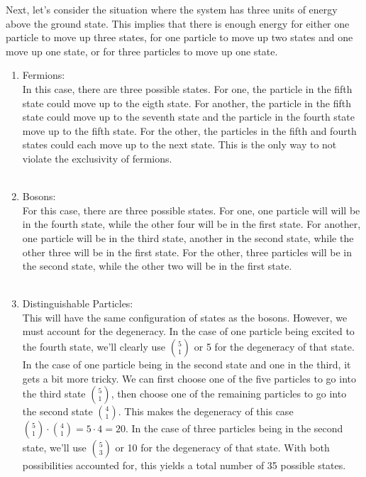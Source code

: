 \documentclass[12pt]{article}
\begin{document}
\begin{flushleft}
\begin{enumerate}
\end{enumerate}

Next, let's consider the situation where the system has three units of energy above the ground state.
This implies that there is enough energy for either one particle to move up three states, for one particle to move up two states and one move up one state, or for three particles to move up one state.
\begin{enumerate}

    \item Fermions:\\
    In this case, there are three possible states.
    For one, the particle in the fifth state could move up to the eigth state.
    For another, the particle in the fifth state could move up to the seventh state and the particle in the fourth state move up to the fifth state.
    For the other, the particles in the fifth and fourth states could each move up to the next state.
    This is the only way to not violate the exclusivity of fermions.\\~\\

    \item Bosons:\\
    For this case, there are three possible states.
    For one, one particle will will be in the fourth state, while the other four will be in the first state.
    For another, one particle will be in the third state, another in the second state, while the other three will be in the first state.
    For the other, three particles will be in the second state, while the other two will be in the first state.\\~\\

    \item Distinguishable Particles:\\
    This will have the same configuration of states as the bosons.
    However, we must account for the degeneracy.
    In the case of one particle being excited to the fourth state, we'll clearly use $5\choose1$ or 5 for the degeneracy of that state.
    In the case of one particle being in the second state and one in the third, it gets a bit more tricky.
    We can first choose one of the five particles to go into the third state $5\choose1$, then choose one of the remaining particles to go into the second state $4\choose1$.
    This makes the degeneracy of this case $\left.5\choose1\right.\cdot\left.4\choose1\right.=5\cdot4=20$.
    In the case of three particles being in the second state, we'll use $5\choose3$ or 10 for the degeneracy of that state.
    With both possibilities accounted for, this yields a total number of 35 possible states.


\end{enumerate}
\end{flushleft}
\end{document}
